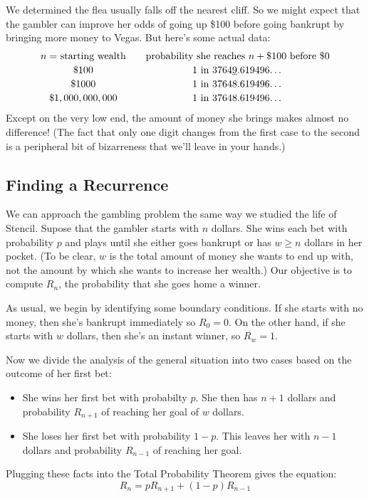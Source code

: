 We determined the flea usually falls off the nearest cliff.  So we
might expect that the gambler can improve her odds of going up \$100
before going bankrupt by bringing more money to Vegas.  But here's
some actual data:
%
\[
\begin{array}{c@{\qquad}c}
\text{$n =$ starting wealth} &
\text{probability she reaches $n + \$100$ before \$0} \\[0.5ex]
\$100 & \text{1 in 3764\underline{9}.619496\ldots} \\[0.5ex]
\$1000 & \text{1 in 37648.619496\ldots} \\[0.5ex]
\$1,000,000,000 & \text{1 in 37648.619496\ldots}
\end{array}
\]
%
Except on the very low end, the amount of money she brings makes
almost no difference!  (The fact that only one digit changes from the
first case to the second is a peripheral bit of bizarreness that we'll
leave in your hands.)

\subsection{Finding a Recurrence}

We can approach the gambling problem the same way we studied the life
of Stencil.  Supose that the gambler starts with $n$ dollars.  She
wins each bet with probability $p$ and plays until she either goes
bankrupt or has $w \geq n$ dollars in her pocket.  (To be clear, $w$
is the total amount of money she wants to end up with, not the amount
by which she wants to increase her wealth.)  Our objective is to
compute $R_n$, the probability that she goes home a winner.

As usual, we begin by identifying some boundary conditions.  If she
starts with no money, then she's bankrupt immediately so $R_0 = 0$.
On the other hand, if she starts with $w$ dollars, then she's an
instant winner, so $R_w = 1$.

Now we divide the analysis of the general situation into two cases
based on the outcome of her first bet:
%
\begin{itemize}

\item She wins her first bet with probabilty $p$.  She then has $n +
1$ dollars and probability $R_{n+1}$ of reaching her goal of $w$
dollars.

\item She loses her first bet with probability $1-p$.  This leaves her
with $n - 1$ dollars and probability $R_{n-1}$ of reaching her goal.

\end{itemize}
%
Plugging these facts into the Total Probability Theorem gives the
equation:
%
\[
R_n = p R_{n+1} + (1 - p) R_{n-1}
\]

